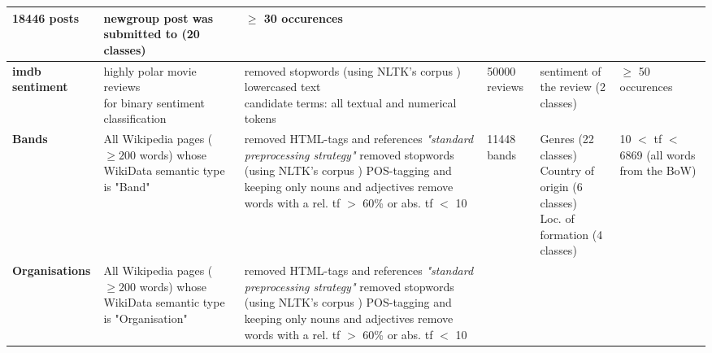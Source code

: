 \begin{landscape}
\begin{table}[]
{\begin{tabular}{@{}llllll@{}}
        		18446 posts &
        		\tabitem newgroup post was submitted to (20 classes) &
        		$\geq$ 30 occurences 
        		\\ \midrule
        	\textbf{imdb sentiment\tablefootnote{\url{http://ai.stanford.edu/~amaas/data/sentiment/} \cite{maas-EtAl:2011:ACL-HLT2011}} \cite{Ager2018}} &
				\specialcell[l]{highly polar movie reviews\\for binary sentiment classification}  &
        		\specialcell[l]{ \tabitem removed stopwords (using NLTK's corpus \cite{loper-bird-2002-nltk})\\ \tabitem lowercased text\\ \tabitem candidate terms: all textual and numerical tokens} &
        		50000 reviews &
        		\tabitem sentiment of the review (2 classes) &
        		$\geq$ 50 occurences
        		\\ \midrule
        	\textbf{Bands \cite{Alshaikh2020}} &
        		\specialcell[l]{All Wikipedia pages ($\geq 200$ words) whose \\ WikiData semantic type is "Band"} &
        		\specialcell[l]{ \tabitem removed HTML-tags and references \\ \tabitem \textit{"standard preprocessing strategy"} \cite[137]{Alshaikh2019} \\ \tabitem removed stopwords (using NLTK's corpus \cite{loper-bird-2002-nltk})\\ \tabitem POS-tagging and keeping only nouns and adjectives \\ \tabitem remove words with a rel. \acrshort{tf}  $>$ 60\% or abs. \acrshort{tf} $<$ 10 } &
        		11448 bands & \specialcell[l]{ \tabitem Genres (22 classes) \\ \tabitem Country of origin (6 classes) \\ \tabitem Loc. of formation (4 classes) }  & 
        		\specialcell[l]{ 10 $<$ \acrshort{tf} $<$ 6869 \\ (all words from the BoW)}\\ \midrule
        	\textbf{Organisations\tablefootnote{\label{fnote:for_alshaikh2019}Originally created in and for \cite{Alshaikh2019}} \cite{Alshaikh2020}} &
        		\specialcell[l]{All Wikipedia pages ($\geq 200$ words) whose \\ WikiData semantic type is "Organisation"} &
        		\specialcell[l]{ \tabitem removed HTML-tags and references \\ \tabitem \textit{"standard preprocessing strategy"} \cite[137]{Alshaikh2019} \\ \tabitem removed stopwords (using NLTK's corpus \cite{loper-bird-2002-nltk})\\ \tabitem POS-tagging and keeping only nouns and adjectives \\ \tabitem remove words with a rel. \acrshort{tf}  $>$ 60\% or abs. \acrshort{tf} $<$ 10 } &

\end{tabular}}
\end{table}
\end{landscape}
